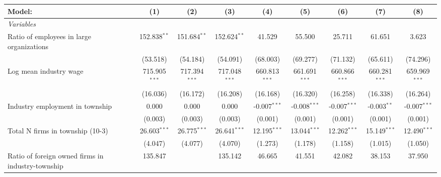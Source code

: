 \begingroup
\centering
\begin{tabular}{lcccccccc}
   \tabularnewline \midrule \midrule
   Model:                                                & (1)             & (2)             & (3)             & (4)              & (5)              & (6)              & (7)              & (8)\\  
   \midrule
   \emph{Variables}\\
   Ratio of employees in large organizations             & 152.838$^{**}$  & 151.684$^{**}$  & 152.624$^{**}$  & 41.529           & 55.500           & 25.711           & 61.651           & 3.623\\   
                                                         & (53.518)        & (54.184)        & (54.091)        & (68.003)         & (69.277)         & (71.132)         & (65.611)         & (74.296)\\   
   Log mean industry wage                                & 715.905$^{***}$ & 717.394$^{***}$ & 717.048$^{***}$ & 660.813$^{***}$  & 661.691$^{***}$  & 660.866$^{***}$  & 660.281$^{***}$  & 659.969$^{***}$\\   
                                                         & (16.036)        & (16.172)        & (16.208)        & (16.168)         & (16.320)         & (16.258)         & (16.338)         & (16.264)\\   
   Industry employment in township                       & 0.000           & 0.000           & 0.000           & -0.007$^{***}$   & -0.008$^{***}$   & -0.007$^{***}$   & -0.003$^{**}$    & -0.007$^{***}$\\   
                                                         & (0.003)         & (0.003)         & (0.003)         & (0.001)          & (0.001)          & (0.001)          & (0.001)          & (0.001)\\   
   Total N firms in township (10-3)                      & 26.603$^{***}$  & 26.775$^{***}$  & 26.641$^{***}$  & 12.195$^{***}$   & 13.044$^{***}$   & 12.262$^{***}$   & 15.149$^{***}$   & 12.490$^{***}$\\   
                                                         & (4.047)         & (4.077)         & (4.070)         & (1.273)          & (1.178)          & (1.158)          & (1.015)          & (1.050)\\   
   Ratio of foreign owned firms in industry-township     & 135.847         &                 & 135.142         & 46.665           & 41.551           & 42.082           & 38.153           & 37.950\\   

\end{tabular}
